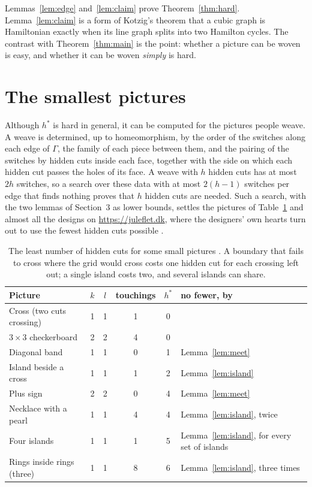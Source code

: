 \documentclass[11pt,a4paper]{article}
\theoremstyle{definition}
\theoremstyle{remark}
\begin{document}
Lemmas~\ref{lem:edge} and~\ref{lem:claim} prove Theorem~\ref{thm:hard}.
Lemma~\ref{lem:claim} is a form of Kotzig's theorem that a cubic graph is
Hamiltonian exactly when its line graph splits into two Hamilton cycles.
The contrast with Theorem~\ref{thm:main} is the point: whether a picture
can be woven is easy, and whether it can be woven \emph{simply} is hard.

\section{The smallest pictures}

Although $h^*$ is hard in general, it can be computed for the pictures
people weave. A weave is determined, up to homeomorphism, by the order of
the switches along each edge of $\Gamma$, the family of each piece between
them, and the pairing of the switches by hidden cuts inside each
face, together with the side on which each hidden cut passes the holes of
its face. A
weave with $h$ hidden cuts has at most $2h$ switches, so a search over
these data with at most $2(h-1)$ switches per edge that finds nothing
proves that $h$ hidden cuts are needed. Such a search, with the two lemmas
of Section~3 as lower bounds, settles the pictures of
Table~\ref{tab:small} and almost all the designs on \url{https://juleflet.dk},
where the designers' own hearts turn out to use the fewest hidden cuts
possible \cite{note}.

\begin{table}[ht]
\centering
\begin{tabular}{@{}lccccl@{}}
\toprule
Picture & $k$ & $l$ & touchings & $h^*$ & no fewer, by\\
\midrule
Cross (two cuts crossing) & 1 & 1 & 1 & 0 & \\
$3\times3$ checkerboard & 2 & 2 & 4 & 0 & \\
Diagonal band & 1 & 1 & 0 & 1 & Lemma~\ref{lem:meet}\\
Island beside a cross & 1 & 1 & 1 & 2 & Lemma~\ref{lem:island}\\
Plus sign & 2 & 2 & 0 & 4 & Lemma~\ref{lem:meet}\\
Necklace with a pearl & 1 & 1 & 4 & 4 & Lemma~\ref{lem:island}, twice\\
Four islands & 1 & 1 & 1 & 5 & Lemma~\ref{lem:island}, for every set of islands\\
Rings inside rings (three) & 1 & 1 & 8 & 6 & Lemma~\ref{lem:island}, three times\\
\bottomrule
\end{tabular}
\caption{The least number of hidden cuts for some small pictures
\cite{note}. A boundary that fails to cross where the grid would cross
costs one hidden cut for each crossing left out; a single island costs
two, and several islands can share.}
\label{tab:small}
\end{table}
\end{document}
